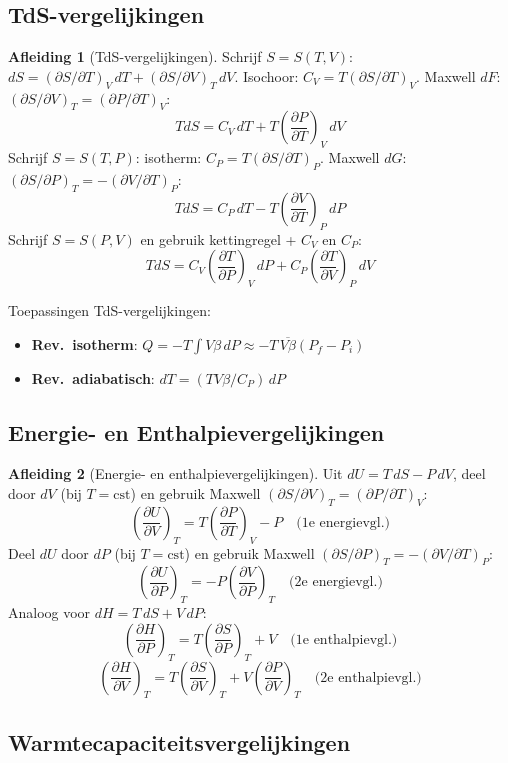 \documentclass[a4paper,twoside,10pt]{article}
\theoremstyle{definition}
\newtheorem{derivation}{Afleiding}[section]
\newcommand{\pd}[3][]{\left(\dfrac{\partial #2}{\partial #3}\right)_{\!#1}}
\begin{document}
\subsection{TdS-vergelijkingen}

\begin{derivation}[TdS-vergelijkingen]
Schrijf $S = S(T,V)$:\;
$dS = (\partial S/\partial T)_V\,dT + (\partial S/\partial V)_T\,dV$.
Isochoor: $C_V = T(\partial S/\partial T)_V$.
Maxwell $dF$: $(\partial S/\partial V)_T = (\partial P/\partial T)_V$:
\[
  \boxed{TdS = C_V\,dT + T\pd[V]{P}{T}\,dV} \tag{TdS-1}
\]
Schrijf $S = S(T,P)$:\;
isotherm: $C_P = T(\partial S/\partial T)_P$.
Maxwell $dG$: $(\partial S/\partial P)_T = -(\partial V/\partial T)_P$:
\[
  \boxed{TdS = C_P\,dT - T\pd[P]{V}{T}\,dP} \tag{TdS-2}
\]
Schrijf $S = S(P,V)$ en gebruik kettingregel + $C_V$ en $C_P$:
\[
  \boxed{TdS = C_V\pd[V]{T}{P}\,dP + C_P\pd[P]{T}{V}\,dV} \tag{TdS-3}
\]
\end{derivation}

Toepassingen TdS-vergelijkingen:
\begin{itemize}
  \item \textbf{Rev.\ isotherm}: $Q = -T\!\int V\beta\,dP \approx -T\,\overline{V\beta}(P_f-P_i)$
  \item \textbf{Rev.\ adiabatisch}: $dT = (TV\beta/C_P)\,dP$
\end{itemize}

\subsection{Energie- en Enthalpievergelijkingen}

\begin{derivation}[Energie- en enthalpievergelijkingen]
Uit $dU = T\,dS - P\,dV$, deel door $dV$ (bij $T=\mathrm{cst}$) en gebruik
Maxwell $(\partial S/\partial V)_T = (\partial P/\partial T)_V$:
\[
  \pd[T]{U}{V} = T\pd[V]{P}{T} - P \quad\text{(1e energievgl.)}
\]
Deel $dU$ door $dP$ (bij $T=\mathrm{cst}$) en gebruik Maxwell $(\partial S/\partial P)_T = -(\partial V/\partial T)_P$:
\[
  \pd[T]{U}{P} = -P\pd[T]{V}{P} \quad\text{(2e energievgl.)}
\]
Analoog voor $dH = T\,dS + V\,dP$:
\[
  \pd[T]{H}{P} = T\pd[T]{S}{P} + V \quad\text{(1e enthalpievgl.)}
\]
\[
  \pd[T]{H}{V} = T\pd[T]{S}{V} + V\pd[T]{P}{V} \quad\text{(2e enthalpievgl.)}
\]
\end{derivation}

\subsection{Warmtecapaciteitsvergelijkingen}
\end{document}
